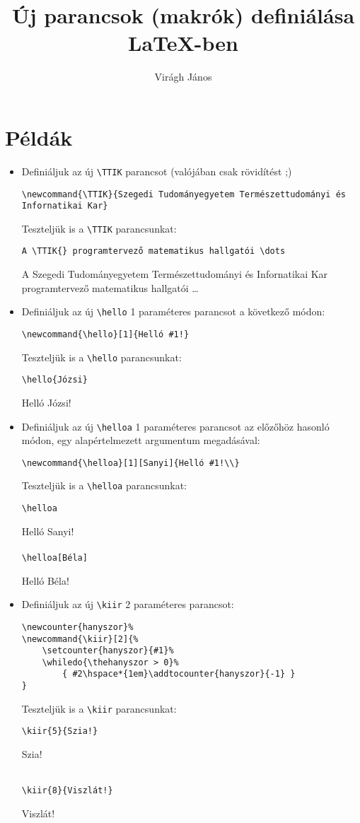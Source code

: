 \documentclass{article}
\title{Új parancsok (makrók) definiálása \LaTeX-ben}
\author{Virágh János}
\begin{document}
\maketitle

\section{Példák}

\begin{itemize}
\item Definiáljuk az új \verb|\TTIK| parancsot (valójában csak rövidítést ;)

\verb|\newcommand{\TTIK}{Szegedi Tudományegyetem Természettudományi és Infornatikai Kar}|
\newcommand{\TTIK}{Szegedi Tudományegyetem Természettudományi és Infornatikai Kar}

Teszteljük is a \verb|\TTIK| parancsunkat:

\verb|A \TTIK{} programtervező matematikus hallgatói \dots|

A \TTIK{} programtervező matematikus hallgatói \dots

\item Definiáljuk az új \verb|\hello| 1 paraméteres parancsot a következő módon:

\verb|\newcommand{\hello}[1]{Helló #1!}|
\newcommand{\hello}[1]{Helló #1!\\}

Teszteljük is a \verb|\hello| parancsunkat:

\verb|\hello{Józsi}|

\hello{Józsi}
\item Definiáljuk az új \verb!\helloa! 1 paraméteres parancsot az előzőhöz hasonló módon, egy alapértelmezett argumentum megadásával:

\verb|\newcommand{\helloa}[1][Sanyi]{Helló #1!\\}|
\newcommand{\helloa}[1][Sanyi]{Helló #1!\\}

Teszteljük is a \verb!\helloa! parancsunkat:

\verb|\helloa|

\helloa\\

\verb|\helloa[Béla]|

\helloa[Béla]

\item Definiáljuk az új \verb!\kiir! 2 paraméteres parancsot:
\vspace*{-1em}
\begin{verbatim}
\newcounter{hanyszor}%
\newcommand{\kiir}[2]{%
	\setcounter{hanyszor}{#1}%
	\whiledo{\thehanyszor > 0}%
		{ #2\hspace*{1em}\addtocounter{hanyszor}{-1} }
}
\end{verbatim}
%
\newcommand{\kiir}[2]{%
	\setcounter{hanyszor}{#1}%
	\whiledo{\thehanyszor > 0}%
		{ #2\hspace*{1em}\addtocounter{hanyszor}{-1} }
}
Teszteljük is a \verb|\kiir| parancsunkat:

\verb|\kiir{5}{Szia!}|

\kiir{5}{Szia!}\\
\verb|\kiir{8}{Viszlát!}|

\kiir{8}{Viszlát!}\\
\end{itemize}
\end{document}
